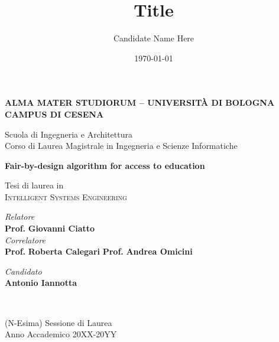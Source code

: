 \title{Title}
\author{Candidate Name Here}
\date{\today}

\begin{titlepage}
	\begin{center}
		
		\large
		\textbf{ALMA MATER STUDIORUM -- UNIVERSITÀ DI BOLOGNA \\ CAMPUS DI CESENA}
		\\
		\noindent\hrulefill
		\vspace{0.4cm}
		
		\Large
		Scuola di Ingegneria e Architettura \\
		Corso di Laurea Magistrale in Ingegneria e Scienze Informatiche
		
		\Huge
		\vspace{4cm}
		\textbf{
			Fair-by-design algorithm for access to education
		}
		
		\large
		\vspace{1cm}
		Tesi di laurea in 
		\\
		\textsc{Intelligent Systems Engineering}
		
		\vspace{5.5cm}
		\begin{minipage}[t]{0.64\textwidth}
			\begin{flushleft}
				\textit{Relatore} 
				\\ 
				\textbf{Prof.} \textbf{Giovanni Ciatto}
				\\
				\vspace{0.4cm}
				\textit{Correlatore} 
				\\
				\textbf{Prof.} \textbf{Roberta Calegari}
				\textbf{Prof.} \textbf{Andrea Omicini}
			\end{flushleft}
		\end{minipage}
		\begin{minipage}[t]{0.34\textwidth}
			\begin{flushright}
				\textit{Candidato} 
				\\ 
				\textbf{Antonio Iannotta}
			\end{flushright}
		\end{minipage}\\
		
		\vfill
		\noindent\hrulefill
		\vspace{0.3cm}
		\Large
		
		(N-Esima) Sessione di Laurea
		\\
		Anno Accademico 20XX-20YY
	\end{center}
\end{titlepage}
\restoregeometry
